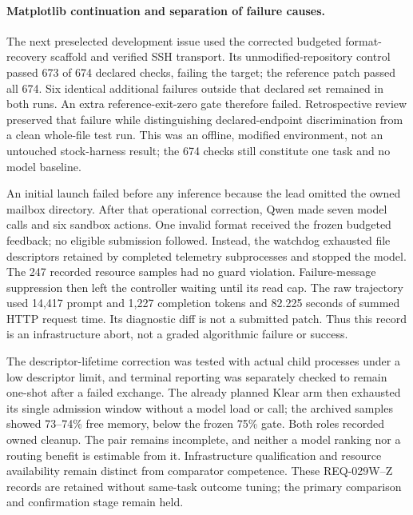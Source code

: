 \paragraph{Matplotlib continuation and separation of failure causes.}
The next preselected development issue used the corrected budgeted format-recovery scaffold and
verified SSH transport. Its unmodified-repository control passed 673 of 674 declared checks, failing
the target; the reference patch passed all 674. Six identical additional failures outside that declared
set remained in both runs. An extra reference-exit-zero gate therefore failed. Retrospective review
preserved that failure while distinguishing declared-endpoint discrimination from a clean whole-file
test run. This was an offline, modified environment, not an untouched stock-harness result; the
674 checks still constitute one task and no model baseline.

An initial launch failed before any inference because the lead omitted the owned mailbox directory.
After that operational correction, Qwen made seven model calls and six sandbox actions. One invalid
format received the frozen budgeted feedback; no eligible submission followed. Instead, the watchdog
exhausted file descriptors retained by completed telemetry subprocesses and stopped the model.
The 247 recorded resource samples had no guard violation. Failure-message suppression then left the
controller waiting until its read cap. The raw trajectory used 14,417 prompt and 1,227 completion
tokens and 82.225 seconds of summed HTTP request time. Its diagnostic diff is not a submitted patch.
Thus this record is an infrastructure abort, not a graded algorithmic failure or success.

The descriptor-lifetime correction was tested with actual child processes under a low descriptor
limit, and terminal reporting was separately checked to remain one-shot after a failed exchange.
The already planned Klear arm then exhausted its single admission window without a model load or
call; the archived samples showed 73--74\% free memory, below the frozen 75\% gate. Both roles
recorded owned cleanup. The pair remains incomplete, and neither a model ranking nor a routing
benefit is estimable from it. Infrastructure qualification and resource availability remain distinct
from comparator competence. These REQ-029W--Z records are retained without same-task outcome tuning;
the primary comparison and confirmation stage remain held.

